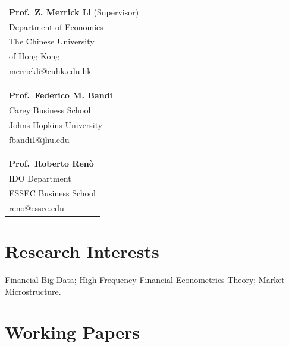 \documentclass[12pt,a4paper]{article}
\begin{document}
\begin{tabular}[t]{@{}l@{}}
    \textbf{Prof.~Z. Merrick Li} (Supervisor) \\
    Department of Economics \\
    The Chinese University \\
    of Hong Kong \\
    \href{mailto:merrickli@cuhk.edu.hk}{merrickli@cuhk.edu.hk}
\end{tabular}\hfill
\begin{tabular}[t]{@{}l@{}}
    \textbf{Prof.~Federico M. Bandi} \\
    Carey Business School \\
    Johns Hopkins University \\
    \href{mailto:fbandi1@jhu.edu}{fbandi1@jhu.edu}
\end{tabular}\hfill
\begin{tabular}[t]{@{}l@{}}
    \textbf{Prof.~Roberto Ren\`o} \\
    IDO Department \\
    ESSEC Business School \\
    \href{mailto:reno@essec.edu}{reno@essec.edu}
\end{tabular}

\section{Research Interests}

Financial Big Data; High-Frequency Financial Econometrics Theory; 
Market Microstructure.


\section{Working Papers}
\end{document}
